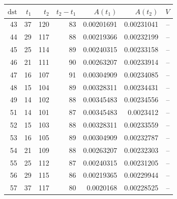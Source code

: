 \begin{tabular}{r r r r r r r}
\toprule
$\mathrm{dst}$ & $t_1$ & $t_2$ & $t_2-t_1$ & $A(t_1)$ & $A(t_2)$ & $V$ \\
\midrule
43 & 37 & 120 & 83 & 0.00201691 & 0.00231041 & -- \\
44 & 29 & 117 & 88 & 0.00219366 & 0.00232199 & -- \\
45 & 25 & 114 & 89 & 0.00240315 & 0.00233158 & -- \\
46 & 21 & 111 & 90 & 0.00263207 & 0.00233914 & -- \\
47 & 16 & 107 & 91 & 0.00304909 & 0.00234085 & -- \\
48 & 15 & 104 & 89 & 0.00328311 & 0.00234431 & -- \\
49 & 14 & 102 & 88 & 0.00345483 & 0.00234556 & -- \\
51 & 14 & 101 & 87 & 0.00345483 & 0.0023412 & -- \\
52 & 15 & 103 & 88 & 0.00328311 & 0.00233559 & -- \\
53 & 16 & 105 & 89 & 0.00304909 & 0.00232787 & -- \\
54 & 21 & 109 & 88 & 0.00263207 & 0.00232303 & -- \\
55 & 25 & 112 & 87 & 0.00240315 & 0.00231205 & -- \\
56 & 29 & 115 & 86 & 0.00219365 & 0.00229944 & -- \\
57 & 37 & 117 & 80 & 0.0020168 & 0.00228525 & -- \\
\bottomrule
\end{tabular}

